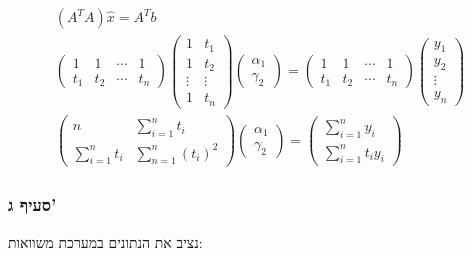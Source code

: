 \documentclass[
]{article}
\begin{document}
\[\begin{gathered}
(A^{T}A)\hat{x}=A^{T}b \\[2ex]
\begin{pmatrix}
1 & 1 & \cdots  & 1 \\
{t}_{1} & {t}_{2} & \cdots  & t_{n}
\end{pmatrix}\begin{pmatrix}
1 & {t}_{1} \\
1 & {t}_{2} \\
\vdots  & \vdots  \\
1 & t_{n}
\end{pmatrix}\begin{pmatrix}
{\alpha}_{1} \\
{\gamma}_{2}
\end{pmatrix}=\begin{pmatrix}
1 & 1 & \cdots  & 1 \\
{t}_{1} & {t}_{2} & \cdots  & t_{n}
\end{pmatrix}\begin{pmatrix}
{y}_{1} \\
{y}_{2} \\
\vdots  \\
y_{n}
\end{pmatrix} \\[2ex]
\begin{pmatrix}
n & \sum_{i=1}^{n}t_{i} \\
\sum_{i=1}^{n}t_{i} & \sum_{n=1}^{n}(t_{i})^{2}  
\end{pmatrix}\begin{pmatrix}
{\alpha}_{1} \\
{\gamma}_{2}
\end{pmatrix}=\begin{pmatrix}
\sum_{i=1}^{n}y_{i} \\
\sum_{i=1}^{n}t_{i}y_{i}  
\end{pmatrix}
\end{gathered}\]

\subsubsection{סעיף ג'}\label{ux5e1ux5e2ux5d9ux5e3-ux5d2-1}

נציב את הנתונים במערכת משוואות:
\end{document}
